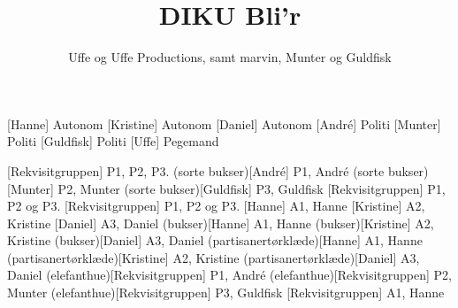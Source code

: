 \documentclass[a4paper,11pt]{article}
\title{DIKU Bli'r}
\author{Uffe og Uffe Productions\texttrademark, samt marvin, Munter og Guldfisk}
\begin{document}
\maketitle

\begin{roles}
[Hanne] Autonom
[Kristine] Autonom
[Daniel] Autonom
[André] Politi
[Munter] Politi
[Guldfisk] Politi
[Uffe] Pegemand
\end{roles}

\begin{props}
[Rekvisitgruppen] P1, P2, P3.
\prop(sorte bukser)[André] P1, André
\prop(sorte bukser)[Munter] P2, Munter
\prop(sorte bukser)[Guldfisk] P3, Guldfisk
[Rekvisitgruppen] P1, P2 og P3.
[Rekvisitgruppen] P1, P2 og P3.
[Hanne] A1, Hanne
[Kristine] A2, Kristine
[Daniel] A3, Daniel
\prop(bukser)[Hanne] A1, Hanne
\prop(bukser)[Kristine] A2, Kristine
\prop(bukser)[Daniel] A3, Daniel
\prop(partisanertørklæde)[Hanne] A1, Hanne
\prop(partisanertørklæde)[Kristine] A2, Kristine
\prop(partisanertørklæde)[Daniel] A3, Daniel
\prop(elefanthue)[Rekvisitgruppen] P1, André
\prop(elefanthue)[Rekvisitgruppen] P2, Munter
\prop(elefanthue)[Rekvisitgruppen] P3, Guldfisk
[Rekvisitgruppen] A1, Hanne
\end{props}
\end{document}
